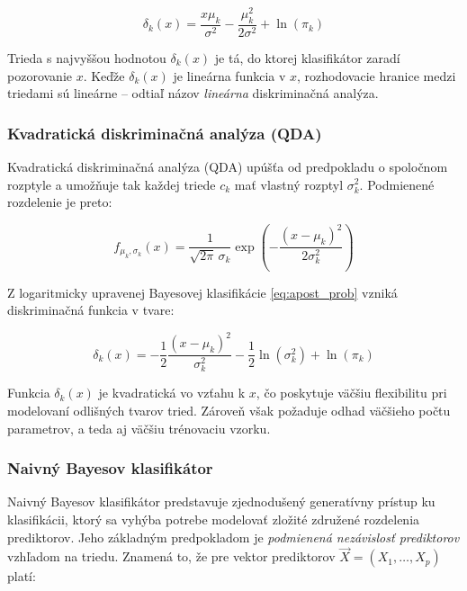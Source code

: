 \begin{equation}
\delta_k(x) = \frac{x \mu_k}{\sigma^2} - \frac{\mu_k^2}{2\sigma^2} + \ln(\pi_k)
\end{equation}

Trieda s najvyššou hodnotou $\delta_k(x)$ je tá, do ktorej klasifikátor zaradí pozorovanie $x$. Keďže $\delta_k(x)$ je lineárna funkcia v $x$, rozhodovacie hranice medzi triedami sú lineárne – odtiaľ názov \textit{lineárna} diskriminačná analýza.

\subsubsection{Kvadratická diskriminačná analýza (QDA)}
\label{subsubsec:qda}

Kvadratická diskriminačná analýza (QDA) upúšťa od predpokladu o spoločnom rozptyle a umožňuje tak každej triede $c_k$ mať vlastný rozptyl $\sigma_k^2$. Podmienené rozdelenie je preto:

\begin{equation}
f_{\mu_k,\sigma_k}(x) = \frac{1}{\sqrt{2\pi} \, \sigma_k} \exp\left( -\frac{(x - \mu_k)^2}{2\sigma_k^2} \right)
\end{equation}

Z logaritmicky upravenej Bayesovej klasifikácie \eqref{eq:apost_prob} vzniká diskriminačná funkcia v tvare:

\begin{equation}
\delta_k(x) = -\frac{1}{2} \frac{(x - \mu_k)^2}{\sigma_k^2} - \frac{1}{2} \ln(\sigma_k^2) + \ln(\pi_k)
\end{equation}

Funkcia $\delta_k(x)$ je kvadratická vo vzťahu k $x$, čo poskytuje väčšiu flexibilitu pri modelovaní odlišných tvarov tried. Zároveň však požaduje odhad väčšieho počtu parametrov, a teda aj väčšiu trénovaciu vzorku.

\subsubsection{Naivný Bayesov klasifikátor}
\label{subsubsec:naivebayes}

Naivný Bayesov klasifikátor predstavuje zjednodušený generatívny prístup ku klasifikácii, ktorý sa vyhýba potrebe modelovať zložité združené rozdelenia prediktorov. Jeho základným predpokladom je \textit{podmienená nezávislosť prediktorov} vzhľadom na triedu. Znamená to, že pre vektor prediktorov $\vec{X} = (X_1, \dots, X_p)$ platí:

